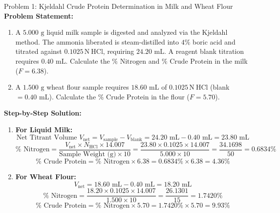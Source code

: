 \documentclass[11pt,a4paper,oneside]{article}
\begin{document}
\begin{examplebox}{Problem 1: Kjeldahl Crude Protein Determination in Milk and Wheat Flour}
\textbf{Problem Statement:}
\begin{enumerate}[label=(\alph*)]
    \item A $5.000\text{ g}$ liquid milk sample is digested and analyzed via the Kjeldahl method. The ammonia liberated is steam-distilled into $4\%$ boric acid and titrated against $0.1025\,\mathrm{N}\ \mathrm{HCl}$, requiring $24.20\text{ mL}$. A reagent blank titration requires $0.40\text{ mL}$. Calculate the $\% \text{ Nitrogen}$ and $\% \text{ Crude Protein}$ in the milk ($F = 6.38$).
    \item A $1.500\text{ g}$ wheat flour sample requires $18.60\text{ mL}$ of $0.1025\,\mathrm{N}\ \mathrm{HCl}$ (blank $= 0.40\text{ mL}$). Calculate the $\% \text{ Crude Protein}$ in the flour ($F = 5.70$).
\end{enumerate}
\vspace{0.2cm}
\textbf{Step-by-Step Solution:}
\begin{enumerate}[label=(\alph*)]
    \item \textbf{For Liquid Milk:}
    $$\text{Net Titrant Volume } V_{\text{net}} = V_{\text{sample}} - V_{\text{blank}} = 24.20\text{ mL} - 0.40\text{ mL} = 23.80\text{ mL}$$
    $$\% \text{ Nitrogen} = \frac{V_{\text{net}} \times N_{\mathrm{HCl}} \times 14.007}{\text{Sample Weight (g)} \times 10} = \frac{23.80 \times 0.1025 \times 14.007}{5.000 \times 10} = \frac{34.1698}{50} = 0.6834\%$$
    $$\% \text{ Crude Protein} = \% \text{ Nitrogen} \times 6.38 = 0.6834\% \times 6.38 = \mathbf{4.36\%}$$
    
    \item \textbf{For Wheat Flour:}
    $$V_{\text{net}} = 18.60\text{ mL} - 0.40\text{ mL} = 18.20\text{ mL}$$
    $$\% \text{ Nitrogen} = \frac{18.20 \times 0.1025 \times 14.007}{1.500 \times 10} = \frac{26.1301}{15} = 1.7420\%$$
    $$\% \text{ Crude Protein} = \% \text{ Nitrogen} \times 5.70 = 1.7420\% \times 5.70 = \mathbf{9.93\%}$$
\end{enumerate}
\end{examplebox}
\end{document}
